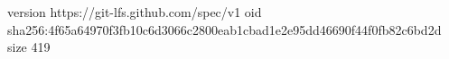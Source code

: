 version https://git-lfs.github.com/spec/v1
oid sha256:4f65a64970f3fb10c6d3066c2800eab1cbad1e2e95dd46690f44f0fb82c6bd2d
size 419
